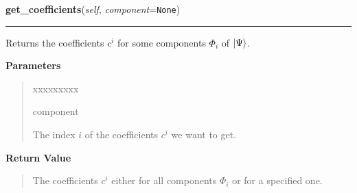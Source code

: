     \label{HagedornWavepacket:HagedornWavepacket:get_coefficients}

    \vspace{0.5ex}

\hspace{.8\funcindent}\begin{boxedminipage}{\funcwidth}

    \raggedright \textbf{get\_coefficients}(\textit{self}, \textit{component}={\tt None})

    \vspace{-1.5ex}

    \rule{\textwidth}{0.5\fboxrule}
\setlength{\parskip}{2ex}
    Returns the coefficients $c^i$ for some components
    $\Phi_i$ of
    $\Ket{\Psi}$.

\setlength{\parskip}{1ex}
      \textbf{Parameters}
      \vspace{-1ex}

      \begin{quote}
        \begin{Ventry}{xxxxxxxxx}

          \item[component]

          The index $i$ of the coefficients $c^i$ we
          want to get.

        \end{Ventry}

      \end{quote}

      \textbf{Return Value}
    \vspace{-1ex}

      \begin{quote}
      The coefficients $c^i$ either for all components
      $\Phi_i$ or for a specified one.

      \end{quote}

    \end{boxedminipage}

    \label{HagedornWavepacket:HagedornWavepacket:get_coefficient_vector}

    \vspace{0.5ex}

